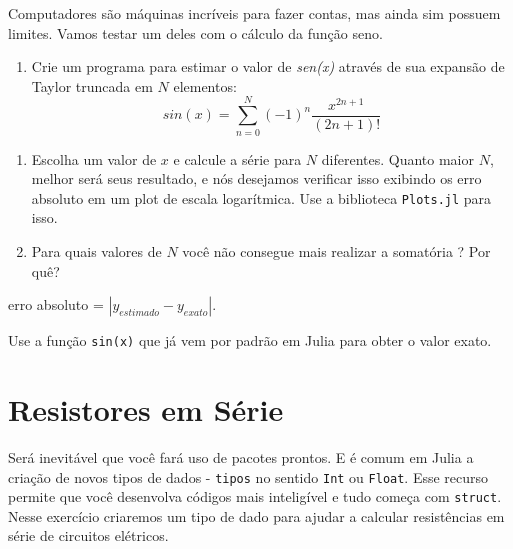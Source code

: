 \documentclass[
  letterpaper,
  DIV=11,
  numbers=noendperiod]{scrreprt}
\providecommand{\tightlist}{%
  \setlength{\itemsep}{0pt}\setlength{\parskip}{0pt}}\usepackage{longtable,booktabs,array}
\begin{document}
Computadores são máquinas incríveis para fazer contas, mas ainda sim
possuem limites. Vamos testar um deles com o cálculo da função seno.

\begin{enumerate}
\def\labelenumi{\arabic{enumi}.}
\setcounter{enumi}{3}
\tightlist
\item
  Crie um programa para estimar o valor de \emph{sen(x)} através de sua
  expansão de Taylor truncada em \(N\) elementos: \[
      sin(x) = \sum_{n=0}^{N} (-1)^n \frac{x^{2n+1}}{(2n+1)!}
   \]
\end{enumerate}

\begin{enumerate}
\def\labelenumi{\alph{enumi}.}
\item
  Escolha um valor de \(x\) e calcule a série para \(N\) diferentes.
  Quanto maior \(N\), melhor será seus resultado, e nós desejamos
  verificar isso exibindo os erro absoluto em um plot de escala
  logarítmica. Use a biblioteca \texttt{Plots.jl} para isso.
\item
  Para quais valores de \(N\) você não consegue mais realizar a
  somatória ? Por quê?
\end{enumerate}

\begin{tcolorbox}[enhanced jigsaw, colbacktitle=quarto-callout-note-color!10!white, coltitle=black, opacitybacktitle=0.6, breakable, colback=white, bottomtitle=1mm, left=2mm, arc=.35mm, leftrule=.75mm, colframe=quarto-callout-note-color-frame, toprule=.15mm, opacityback=0, toptitle=1mm, titlerule=0mm, title=\textcolor{quarto-callout-note-color}{\faInfo}\hspace{0.5em}{Observação}, rightrule=.15mm, bottomrule=.15mm]
erro absoluto = \(|y_{estimado} - y_{exato}|\).

Use a função \texttt{sin(x)} que já vem por padrão em Julia para obter o
valor exato.
\end{tcolorbox}

\hypertarget{resistores-em-suxe9rie}{%
\section{Resistores em Série}\label{resistores-em-suxe9rie}}

Será inevitável que você fará uso de pacotes prontos. E é comum em Julia
a criação de novos tipos de dados - \texttt{tipos} no sentido
\texttt{Int} ou \texttt{Float}. Esse recurso permite que você desenvolva
códigos mais inteligível e tudo começa com \texttt{struct}. Nesse
exercício criaremos um tipo de dado para ajudar a calcular resistências
em série de circuitos elétricos.
\end{document}
